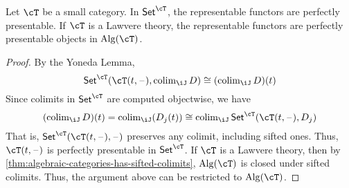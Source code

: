 \documentclass{zett}
\begin{document}
\begin{thm}\label{thm:represented-functors-perfectly-presentable}
  Let $\cT$ be a small category.
  In $\CSet^{\cT}$, the representable functors are perfectly presentable.
  If $\cT$ is a Lawvere theory, the representable functors are perfectly presentable objects in $\Alg(\cT)$.
\end{thm}
\begin{proof}
  By the Yoneda Lemma,
  \[
    \CSet^{\cT}(\cT(t,\blank), \colim_{\iJ} D) \iso (\colim_{\iJ} D)(t)
  \]
  Since colimits in $\CSet^{\cT}$ are computed objectwise, we have
  \[
    (\colim_{\iJ} D)(t) = \colim_{\iJ}(D_{j}(t)) \iso \colim_{\iJ}\CSet^{\cT}(\cT(t,\blank), D_{j})
  \]
  That is, $\CSet^{\cT}(\cT(t,\blank), \blank)$ preserves any colimit, including sifted ones.
  Thus, $\cT(t,\blank)$ is perfectly presentable in $\CSet^{\cT}$.
  If $\cT$ is a Lawvere theory, then by \cref{thm:algebraic-categories-has-sifted-colimits}, $\Alg(\cT)$ is closed under sifted colimits.
  Thus, the argument above can be restricted to $\Alg(\cT)$.
\end{proof}
\end{document}
